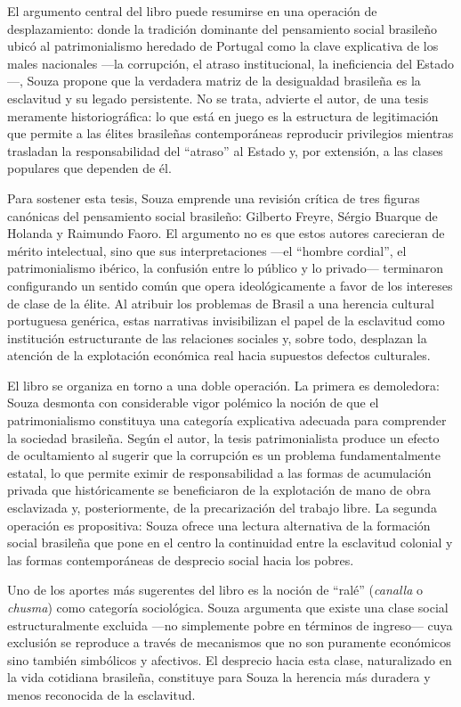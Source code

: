 \documentclass{article}
\begin{document}
El argumento central del libro puede resumirse en una operación de desplazamiento: donde la tradición dominante del pensamiento social brasileño ubicó al patrimonialismo heredado de Portugal como la clave explicativa de los males nacionales —la corrupción, el atraso institucional, la ineficiencia del Estado—, Souza propone que la verdadera matriz de la desigualdad brasileña es la esclavitud y su legado persistente. No se trata, advierte el autor, de una tesis meramente historiográfica: lo que está en juego es la estructura de legitimación que permite a las élites brasileñas contemporáneas reproducir privilegios mientras trasladan la responsabilidad del “atraso” al Estado y, por extensión, a las clases populares que dependen de él.

Para sostener esta tesis, Souza emprende una revisión crítica de tres figuras canónicas del pensamiento social brasileño: Gilberto Freyre, Sérgio Buarque de Holanda y Raimundo Faoro. El argumento no es que estos autores carecieran de mérito intelectual, sino que sus interpretaciones —el “hombre cordial”, el patrimonialismo ibérico, la confusión entre lo público y lo privado— terminaron configurando un sentido común que opera ideológicamente a favor de los intereses de clase de la élite. Al atribuir los problemas de Brasil a una herencia cultural portuguesa genérica, estas narrativas invisibilizan el papel de la esclavitud como institución estructurante de las relaciones sociales y, sobre todo, desplazan la atención de la explotación económica real hacia supuestos defectos culturales.

El libro se organiza en torno a una doble operación. La primera es demoledora: Souza desmonta con considerable vigor polémico la noción de que el patrimonialismo constituya una categoría explicativa adecuada para comprender la sociedad brasileña. Según el autor, la tesis patrimonialista produce un efecto de ocultamiento al sugerir que la corrupción es un problema fundamentalmente estatal, lo que permite eximir de responsabilidad a las formas de acumulación privada que históricamente se beneficiaron de la explotación de mano de obra esclavizada y, posteriormente, de la precarización del trabajo libre. La segunda operación es propositiva: Souza ofrece una lectura alternativa de la formación social brasileña que pone en el centro la continuidad entre la esclavitud colonial y las formas contemporáneas de desprecio social hacia los pobres.

Uno de los aportes más sugerentes del libro es la noción de “ralé” (\textit{canalla} o \textit{chusma}) como categoría sociológica. Souza argumenta que existe una clase social estructuralmente excluida —no simplemente pobre en términos de ingreso— cuya exclusión se reproduce a través de mecanismos que no son puramente económicos sino también simbólicos y afectivos. El desprecio hacia esta clase, naturalizado en la vida cotidiana brasileña, constituye para Souza la herencia más duradera y menos reconocida de la esclavitud.
\end{document}
